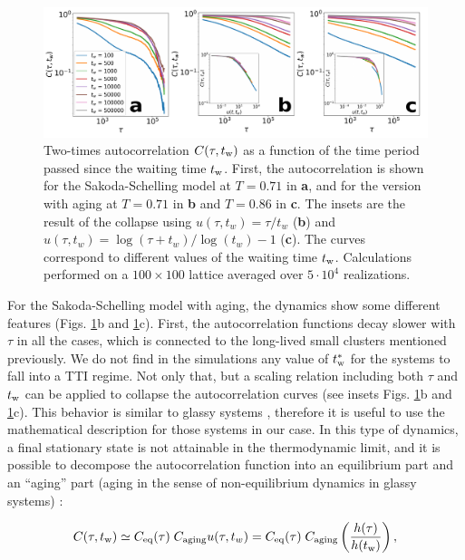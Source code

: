 \begin{figure}
\centering \captionsetup{font=sf}
\includegraphics[width=\linewidth]{Figs/Aging_Schelling/fig5new.pdf} 
\caption[Two-times autocorrelation]{Two-times autocorrelation $C (\tau,t_{\rm{w}})$ as a function of the time period passed since the waiting time $t_{\rm{w}}$. First, the autocorrelation is shown for the Sakoda-Schelling model at $T = 0.71$ in \textbf{a}, and for the version with aging at $T = 0.71$ in \textbf{b} and $T = 0.86$ in \textbf{c}. The insets are the result of the collapse using $u(\tau,t_w) = \tau/t_w$ (\textbf{b}) and $u(\tau,t_w) = \log(\tau+t_w)/\log(t_w) - 1$ (\textbf{c}). The curves correspond to different values of the waiting time $t_{\rm{w}}$. Calculations performed on a $100 \times 100$ lattice averaged over $5 \cdot 10^{4}$ realizations.}
\label{Fig5}
\end{figure}

For the Sakoda-Schelling model with aging, the dynamics show some different features (Figs. \ref{Fig5}b and \ref{Fig5}c). First, the autocorrelation functions decay slower with $\tau$ in all the cases, which is connected to the long-lived small clusters mentioned previously. We do not find in the simulations any value of $t_{\rm{w}}^*$ for the systems to fall into a TTI regime. Not only that, but a scaling relation including both $\tau$ and $t_{\rm{w}}$ can be applied to collapse the autocorrelation curves (see insets Figs. \ref{Fig5}b and \ref{Fig5}c). This behavior is similar to glassy systems \cite{spinglassbook}, therefore it is useful to use the mathematical description for those systems in our case. In this type of dynamics, a final stationary state is not attainable in the thermodynamic limit, and it is possible to decompose the autocorrelation function into an equilibrium part and an ``aging'' part (aging in the sense of non-equilibrium dynamics in glassy systems)  \cite{spinglassbook,Heisemberg}:

\begin{equation}
    C (\tau, t_{\rm{w}}) \simeq C_{\rm{eq}}(\tau) \; C_{\rm{aging}} u(\tau,t_w) = C_{\rm{eq}}(\tau) \; C_{\rm{aging}} \left( \frac{h (\tau) }{h(t_{\rm{w}})} \right),
\end{equation}

